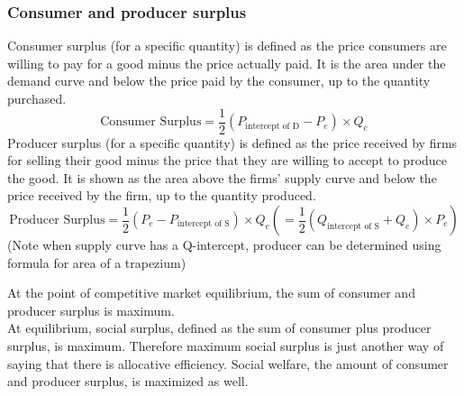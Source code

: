 \subsubsection*{Consumer and producer surplus}
Consumer surplus (for a specific quantity) is defined as the price consumers are willing to pay for a good minus the price actually paid. It is the area under the demand curve and below the price paid by the consumer, up to the quantity purchased.
\[\text{Consumer Surplus}=\dfrac{1}{2}(P_\text{intercept of D}-P_e)\times Q_e\]
Producer surplus (for a specific quantity) is defined as the price received by firms for selling their good minus the price that they are willing to accept to produce the good. It is shown as the area above the firms' supply curve and below the price received by the firm, up to the quantity produced.
\[\text{Producer Surplus}=\dfrac{1}{2}(P_e-P_\text{intercept of S})\times Q_e\left(=\dfrac{1}{2}(Q_\text{intercept of S}+Q_e)\times P_e\right)\]
(Note when supply curve has a Q-intercept, producer can be determined using formula for area of a trapezium)

\begin{center}
\end{center}
At the point of competitive market equilibrium, the sum of consumer and producer surplus is maximum.\\
At equilibrium, social surplus, defined as the sum of consumer plus producer surplus, is maximum. Therefore maximum social surplus is just another way of saying that there is allocative efficiency.
Social welfare, the amount of consumer and producer surplus, is maximized as well.
